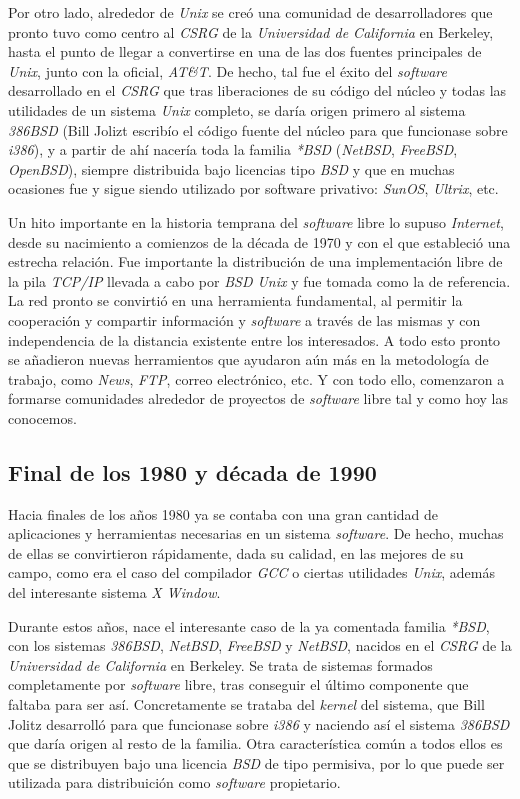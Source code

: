 Por otro lado, alrededor de \textit{Unix} se creó una comunidad de
desarrolladores que pronto tuvo como centro al \textit{CSRG} de la
\textit{Universidad de California} en Berkeley, hasta el punto de llegar a
convertirse en una de las dos fuentes principales de \textit{Unix}, junto con la
oficial, \textit{AT&T}. De hecho, tal fue el éxito del \textit{software}
desarrollado en el \textit{CSRG} que tras liberaciones de su código del núcleo y
todas las utilidades de un sistema \textit{Unix} completo, se daría origen
primero al sistema \textit{386BSD} (Bill Jolizt escribío el código fuente del
núcleo para que funcionase sobre \textit{i386}), y a partir de ahí nacería toda
la familia \textit{*BSD} (\textit{NetBSD}, \textit{FreeBSD}, \textit{OpenBSD}),
siempre distribuida bajo licencias tipo \textit{BSD} y que en muchas ocasiones
fue y sigue siendo utilizado por software privativo: \textit{SunOS},
\textit{Ultrix}, etc.

Un hito importante en la historia temprana del \textit{software} libre lo supuso
\textit{Internet}, desde su nacimiento a comienzos de la década de 1970 y con el
que estableció una estrecha relación. Fue importante la distribución de una
implementación libre de la pila \textit{TCP/IP} llevada a cabo por \textit{BSD
Unix} y fue tomada como la de referencia. La red pronto se convirtió en una
herramienta fundamental, al permitir la cooperación y compartir información y
\textit{software} a través de las mismas y con independencia de la distancia
existente entre los interesados. A todo esto pronto se añadieron nuevas
herramientos que ayudaron aún más en la metodología de trabajo, como
\textit{News}, \textit{FTP}, correo electrónico, etc. Y con todo ello,
comenzaron a formarse comunidades alrededor de proyectos de \textit{software}
libre tal y como hoy las conocemos.

\subsection{Final de los 1980 y década de 1990}

Hacia finales de los años 1980 ya se contaba con una gran cantidad de
aplicaciones y herramientas necesarias en un sistema \textit{software}. De
hecho, muchas de ellas se convirtieron rápidamente, dada su calidad, en las
mejores de su campo, como era el caso del compilador \textit{GCC} o ciertas
utilidades \textit{Unix}, además del interesante sistema \textit{X Window}.

Durante estos años, nace el interesante caso de la ya comentada familia
\textit{*BSD}, con los sistemas \textit{386BSD}, \textit{NetBSD},
\textit{FreeBSD} y \textit{NetBSD}, nacidos en el \textit{CSRG} de la
\textit{Universidad de California} en Berkeley. Se trata de sistemas formados
completamente por \textit{software} libre, tras conseguir el último componente
que faltaba para ser así. Concretamente se trataba del \textit{kernel} del
sistema, que Bill Jolitz desarrolló para que funcionase sobre \textit{i386} y
naciendo así el sistema \textit{386BSD} que daría origen al resto de la familia.
Otra característica común a todos ellos es que se distribuyen bajo una licencia
\textit{BSD} de tipo permisiva, por lo que puede ser utilizada para
distribuición como \textit{software} propietario.

